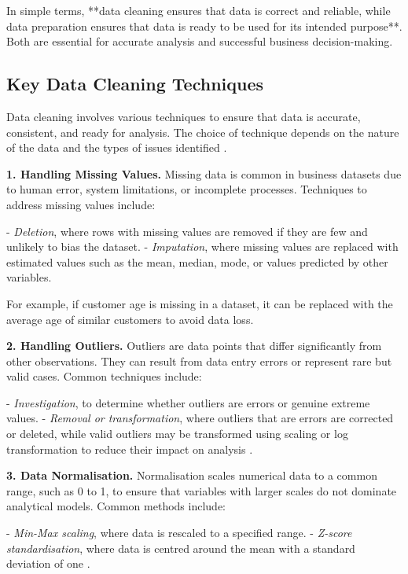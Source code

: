 In simple terms, **data cleaning ensures that data is correct and reliable, while data preparation ensures that data is ready to be used for its intended purpose**. Both are essential for accurate analysis and successful business decision-making.

\subsection{Key Data Cleaning Techniques}

Data cleaning involves various techniques to ensure that data is accurate, consistent, and ready for analysis. The choice of technique depends on the nature of the data and the types of issues identified \cite{rahm2000data}.

\textbf{1. Handling Missing Values.}  
Missing data is common in business datasets due to human error, system limitations, or incomplete processes. Techniques to address missing values include:

- \emph{Deletion}, where rows with missing values are removed if they are few and unlikely to bias the dataset.
- \emph{Imputation}, where missing values are replaced with estimated values such as the mean, median, mode, or values predicted by other variables.

For example, if customer age is missing in a dataset, it can be replaced with the average age of similar customers to avoid data loss.

\textbf{2. Handling Outliers.}  
Outliers are data points that differ significantly from other observations. They can result from data entry errors or represent rare but valid cases. Common techniques include:

- \emph{Investigation}, to determine whether outliers are errors or genuine extreme values.
- \emph{Removal or transformation}, where outliers that are errors are corrected or deleted, while valid outliers may be transformed using scaling or log transformation to reduce their impact on analysis \cite{barnett1994outliers}.

\textbf{3. Data Normalisation.}  
Normalisation scales numerical data to a common range, such as 0 to 1, to ensure that variables with larger scales do not dominate analytical models. Common methods include:

- \emph{Min-Max scaling}, where data is rescaled to a specified range.  
- \emph{Z-score standardisation}, where data is centred around the mean with a standard deviation of one \cite{jain2005score}.

